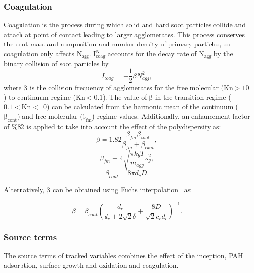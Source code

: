 \subsubsection{Coagulation}
\label{sec:monocoag}
Coagulation is the process during which solid and hard soot particles collide and attach at point of contact leading to larger agglomerates. This process conserves the soot mass and composition and number density of primary particles, so coagulation only affects $\mathrm{N_{agg}}$. $\mathrm{I^N_{coag}}$ accounts for the decay rate of $\mathrm{N_{agg}}$ by the binary collision of soot particles by
\begin{equation}
	I_{coag} = -\frac{1}{2}\beta N^2_{agg}
	\label{eqn:Icoag},
\end{equation}
where $\mathrm{\beta}$ is the collision frequency of agglomerates for the free molecular ($\mathrm{Kn>10}$) to continuum regime ($\mathrm{Kn<0.1}$). The value of $\mathrm{\beta}$ in the transition regime ($\mathrm{0.1<Kn<10}$) can be calculated from the harmonic mean of the continuum ($\mathrm{\beta_{cont}}$) and free molecular ($\mathrm{\beta_{fm}}$) regime values. Additionally, an enhancement factor of \%82 is applied to take into account the effect of the polydispersity as:
\begin{equation}
	\beta = 1.82\frac{\beta_{fm}\beta_{cont}}{\beta_{fm}+\beta_{cont}}
	\label{eqn:betahmmono},
\end{equation}
\begin{equation}
	\beta_{fm} = 4\sqrt{\frac{\pi k_b T}{m_{agg}}} d^2_g
	\label{eqn:betafmmono},
\end{equation}
\begin{equation}
	\beta_{cont} = 8\pi d_c D
	\label{eqn:betacontmono}.
\end{equation}

Alternatively, $\mathrm{\beta}$ can be obtained using Fuchs interpolation~\citep{fuchs1965mechanics} as:

\begin{equation}
	\beta = \beta_{cont}
	\left(
		\frac{d_c}{d_c+2\sqrt{2}\delta} +
		\frac{8D}{\sqrt{2}c_r d_c}
	\right)^{-1}
	\label{eqn:betafuchsmono}.
\end{equation}

\subsubsection{Source terms}
The source terms of tracked variables combines the effect of the inception, PAH adsorption, surface growth and oxidation and coagulation.

